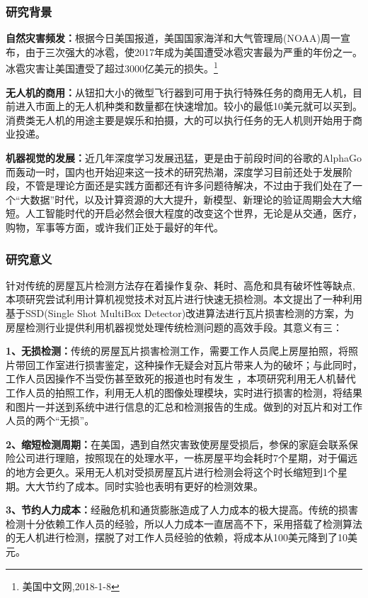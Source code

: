 \subsubsection{研究背景}
\textbf{自然灾害频发：}根据今日美国报道，美国国家海洋和大气管理局(NOAA)周一宣布，由于三次强大的冰雹，使2017年成为美国遭受冰雹灾害最为严重的年份之一。冰雹灾害让美国遭受了超过3000亿美元的损失。\footnote{美国中文网,2018-1-8}

\textbf{无人机的商用：}从钮扣大小的微型飞行器到可用于执行特殊任务的商用无人机，目前进入市面上的无人机种类和数量都在快速增加。较小的最低10美元就可以买到。消费类无人机的用途主要是娱乐和拍摄，大的可以执行任务的无人机则开始用于商业投递。

\textbf{机器视觉的发展：}近几年深度学习发展迅猛，更是由于前段时间的谷歌的AlphaGo而轰动一时，国内也开始迎来这一技术的研究热潮，深度学习目前还处于发展阶段，不管是理论方面还是实践方面都还有许多问题待解决，不过由于我们处在了一个“大数据”时代，以及计算资源的大大提升，新模型、新理论的验证周期会大大缩短。人工智能时代的开启必然会很大程度的改变这个世界，无论是从交通，医疗，购物，军事等方面，或许我们正处于最好的年代。

\subsubsection{研究意义}
针对传统的房屋瓦片检测方法存在着操作复杂、耗时、高危和具有破坏性等缺点,本项研究尝试利用计算机视觉技术对瓦片进行快速无损检测。本文提出了一种利用基于SSD(Single Shot MultiBox Detector)\cite{ssd}改进算法进行瓦片损害检测的方案，为房屋检测行业提供利用机器视觉处理传统检测问题的高效手段。其意义有三：

\textbf{1、无损检测：}传统的房屋瓦片损害检测工作，需要工作人员爬上房屋拍照，将照片带回工作室进行损害鉴定，这种操作无疑会对瓦片带来人为的破坏；与此同时，工作人员因操作不当受伤甚至致死的报道也时有发生 ，本项研究利用无人机替代工作人员的拍照工作，利用无人机的图像处理模块，实时进行损害的检测，将结果和图片一并送到系统中进行信息的汇总和检测报告的生成。做到的对瓦片和对工作人员的两个“无损”。

\textbf{2、缩短检测周期：}在美国，遇到自然灾害致使房屋受损后，参保的家庭会联系保险公司进行理赔，按照现在的处理水平，一栋房屋平均会耗时7个星期，对于偏远的地方会更久。采用无人机对受损房屋瓦片进行检测会将这个时长缩短到1个星期。大大节约了成本。同时实验也表明有更好的检测效果。

\textbf{3、节约人力成本：}经融危机和通货膨胀造成了人力成本的极大提高。传统的损害检测十分依赖工作人员的经验，所以人力成本一直居高不下，采用搭载了检测算法的无人机进行检测，摆脱了对工作人员经验的依赖，将成本从100美元降到了10美元。